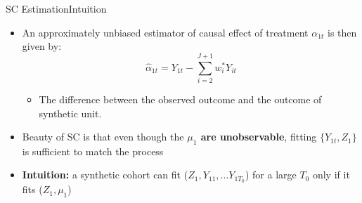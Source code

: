 \documentclass[dvipsnames,hyperref={pdfpagelabels=false}]{beamer}
\begin{document}
\begin{frame}{SC Estimation}{Intuition}
\begin{itemize}
\item An approximately unbiased estimator of causal effect of treatment $\alpha_{1t}$ is then given by:
\begin{equation*}
\hat{\alpha}_{1t}=Y_{1t}-\sum^{J+1}_{i=2}w^*_iY_{it}
\end{equation*}

\begin{itemize}
\item The difference between the observed outcome and the outcome of synthetic unit.

\end{itemize}

\vspace{0.2cm}
\item Beauty of SC is that even though the \textbf{$\mu_1$ are unobservable}, fitting $\{Y_{1t},Z_{1}\}$ is sufficient to match the process
\vspace{0.2cm}
\item \textbf{Intuition:} a synthetic cohort can fit ($Z_{1},Y_{11},...Y_{1T_{0}} $) for a large $T_{0}$ only if it fits ($Z_{1},\mu_{1} $)
\end{itemize}
\end{frame}


%	
%			
%			
%			
%			
%
%			
%			
%		
%			
%		
\end{document}
